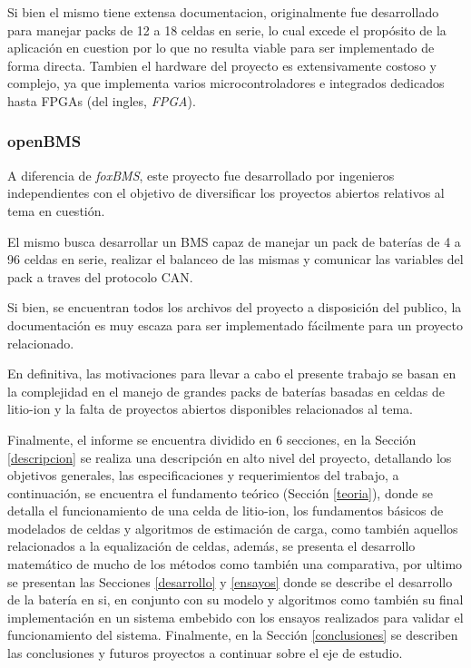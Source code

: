 \documentclass[10pt,a4paper]{article}
\begin{document}
\noindent Si bien el mismo tiene extensa documentacion, originalmente fue
desarrollado para manejar packs de 12 a 18 celdas en serie, lo cual excede el
prop\'osito de la aplicaci\'on en cuestion por lo que no resulta viable para ser
implementado de forma directa. Tambien el hardware del proyecto es
extensivamente costoso y complejo, ya que implementa varios microcontroladores e
integrados dedicados hasta \acrshort{FPGA}s (del ingles, \emph{\acrlong{FPGA}}).

\subsubsection{openBMS}

A diferencia de \emph{foxBMS}, este proyecto fue desarrollado por ingenieros
independientes con el objetivo de diversificar los proyectos abiertos relativos
al tema en cuesti\'on.

\noindent El mismo busca desarrollar un \acrshort{BMS} capaz de manejar un
pack de bater\'ias de 4 a 96 celdas en serie, realizar el balanceo de las mismas 
y comunicar las variables del pack a traves del protocolo \acrshort{CAN}.

\noindent Si bien, se encuentran todos los archivos del proyecto a disposición
del publico, la documentaci\'on es muy escaza para ser implementado
f\'acilmente para un proyecto relacionado.

\noindent En definitiva, las motivaciones para llevar a cabo el presente trabajo
se basan en la complejidad en el manejo de grandes packs de
bater\'ias basadas en celdas de litio-ion y la falta de proyectos abiertos
disponibles relacionados al tema.

\noindent Finalmente, el informe se encuentra dividido en 6 secciones, en
la Sección \ref{descripcion} se realiza una descripci\'on en alto nivel del
proyecto, detallando los objetivos generales, las especificaciones y
requerimientos del trabajo, a continuaci\'on, se encuentra el fundamento 
te\'orico (Secci\'on \ref{teoria}), donde se detalla el funcionamiento de una 
celda de litio-ion, los fundamentos b\'asicos de modelados de celdas y 
algoritmos de estimaci\'on de carga, como tambi\'en aquellos relacionados a la 
equalizaci\'on de celdas, adem\'as, se presenta el desarrollo matem\'atico de 
mucho de los m\'etodos como tambi\'en una comparativa, por ultimo se presentan 
las Secciones \ref{desarrollo} y \ref{ensayos} donde se describe el desarrollo 
de la bater\'ia en si, en conjunto con su modelo y algoritmos como tambi\'en su 
final implementaci\'on en un sistema embebido con los ensayos realizados para 
validar el funcionamiento del sistema. Finalmente, en la Secci\'on 
\ref{conclusiones} se describen las conclusiones y futuros proyectos a continuar 
sobre el eje de estudio.
\end{document}
